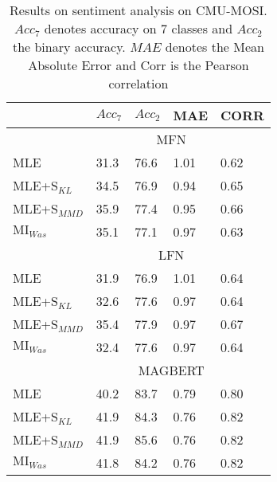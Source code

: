 \documentclass[letterpaper]{article} %
\begin{document}
\begin{table}[htb]
\begin{tabular}{|l|llll|}
\hline
   & $Acc_{7}$   & $Acc_{2}$   & MAE  & CORR \\
\hline
\hline
   & & \multicolumn{2}{c}{MFN} &  \\
\hline
MLE & 31.3 & 76.6 & 1.01 & 0.62 \\
MLE+$\text{S}_{KL}$ & 34.5 & 76.9 & 0.94 & 0.65 \\
MLE+$\text{S}_{MMD}$ & 35.9 & 77.4 & 0.95 & 0.66 \\
$\text{MI}_{Was}$ & 35.1 & 77.1 & 0.97 & 0.63 \\
\hline
   & & \multicolumn{2}{c}{LFN} &  \\
\hline
MLE & 31.9 & 76.9 & 1.01 & 0.64 \\
MLE+$\text{S}_{KL}$ & 32.6 & 77.6 & 0.97 & 0.64 \\
MLE+$\text{S}_{MMD}$ & 35.4 & 77.9 & 0.97 & 0.67 \\
$\text{MI}_{Was}$ & 32.4 & 77.6 & 0.97 & 0.64 \\
\hline
   & &\multicolumn{2}{c}{MAGBERT} & \\
\hline
MLE & 40.2 & 83.7 & 0.79 & 0.80 \\
MLE+$\text{S}_{KL}$ & 41.9 & 84.3 & 0.76 & 0.82 \\
MLE+$\text{S}_{MMD}$ & 41.9 & 85.6 & 0.76 & 0.82 \\
$\text{MI}_{Was}$ & 41.8 & 84.2 & 0.76 & 0.82 \\
\hline
\end{tabular}
\caption{Results on sentiment analysis on CMU-MOSI. $Acc_{7}$ denotes accuracy on 7 classes and $Acc_{2}$ the binary accuracy. $MAE$ denotes the Mean Absolute Error and Corr is the Pearson correlation \label{tab:mosi}}
\end{table}
\end{document}
